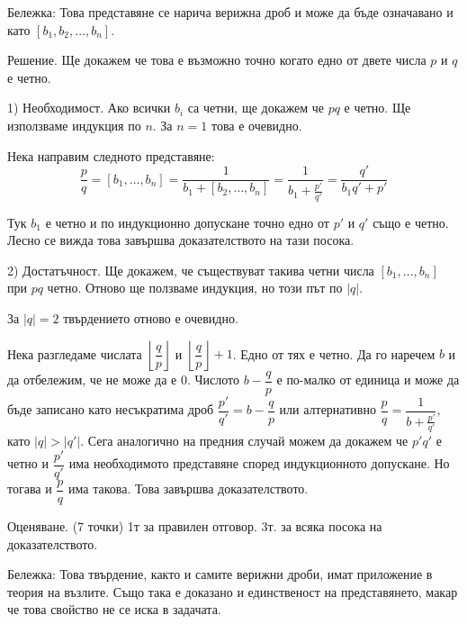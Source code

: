 Бележка: Това представяне се нарича верижна дроб и може да бъде означавано и като $[b_1,b_2,\ldots,b_n]$.

Решение. Ще докажем че това е възможно точно когато едно от двете числа $p$ и $q$ е четно.

1) Необходимост. Ако всички $b_i$ са четни, ще докажем че $pq$ е четно. Ще използваме индукция по $n$. За $n=1$ това е очевидно.

Нека направим следното представяне:
$$
\frac pq=[b_1,\ldots,b_n]=\frac{1}{b_1+[b_2,\ldots,b_n]}=\frac{1}{b_1+\frac{p'}{q'}}=\frac{q'}{b_1q'+p'}
$$

Тук $b_1$ е четно и по индукционно допускане точно едно от $p'$ и $q'$ също е четно. Лесно се вижда това завършва доказателството на тази посока.

2) Достатъчност. Ще докажем, че съществуват такива четни числа $[b_1,\ldots,b_n]$ при $pq$ четно. Отново ще ползваме индукция, но този път по $|q|$.

За $|q|=2$ твърдението отново е очевидно.

Нека разгледаме числата $\left\lfloor\dfrac qp\right\rfloor$ и $\left\lfloor\dfrac qp\right\rfloor+1$. Едно от тях е четно. Да го наречем $b$ и да отбележим, че не може да е 0. Числото $b-\dfrac qp$ е по-малко от единица и може да бъде записано като несъкратима дроб $\dfrac{p'}{q'}=b-\dfrac qp$ или алтернативно $\dfrac pq=\dfrac{1}{b+\frac{p'}{q'}}$, като $|q|>|q'|$. Сега аналогично на предния случай можем да докажем че $p'q'$ е четно и $\dfrac{p'}{q'}$ има необходимото представяне според индукционното допускане. Но тогава и $\dfrac pq$ има такова. Това завършва доказателството.

Оценяване. (7 точки) 1т за правилен отговор. 3т. за всяка посока на доказателството.

Бележка: Това твърдение, както и самите верижни дроби, имат приложение в теория на възлите. Също така е доказано и единственост на представянето, макар че това свойство не се иска в задачата.
